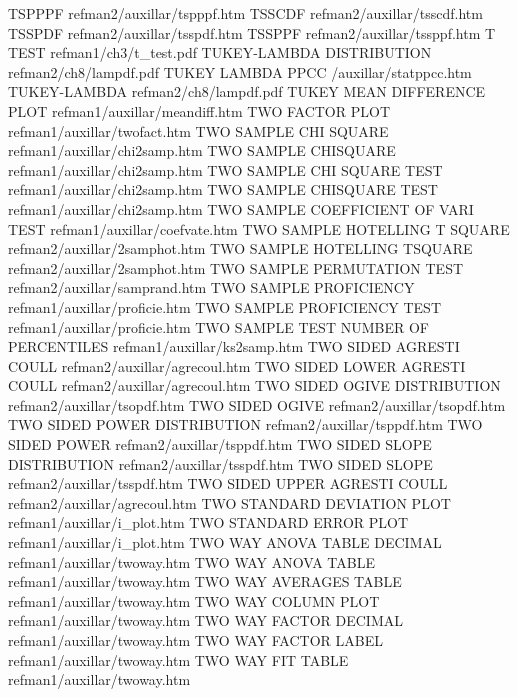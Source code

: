 TSPPPF                                  refman2/auxillar/tspppf.htm
TSSCDF                                  refman2/auxillar/tsscdf.htm
TSSPDF                                  refman2/auxillar/tsspdf.htm
TSSPPF                                  refman2/auxillar/tssppf.htm
T TEST                                  refman1/ch3/t_test.pdf
TUKEY-LAMBDA DISTRIBUTION               refman2/ch8/lampdf.pdf
TUKEY LAMBDA PPCC                       /auxillar/statppcc.htm
TUKEY-LAMBDA                            refman2/ch8/lampdf.pdf
TUKEY MEAN DIFFERENCE PLOT              refman1/auxillar/meandiff.htm
TWO FACTOR PLOT                         refman1/auxillar/twofact.htm
TWO SAMPLE CHI SQUARE                   refman1/auxillar/chi2samp.htm
TWO SAMPLE CHISQUARE                    refman1/auxillar/chi2samp.htm
TWO SAMPLE CHI SQUARE TEST              refman1/auxillar/chi2samp.htm
TWO SAMPLE CHISQUARE TEST               refman1/auxillar/chi2samp.htm
TWO SAMPLE COEFFICIENT OF VARI TEST     refman1/auxillar/coefvate.htm
TWO SAMPLE HOTELLING T SQUARE           refman2/auxillar/2samphot.htm
TWO SAMPLE HOTELLING TSQUARE            refman2/auxillar/2samphot.htm
TWO SAMPLE PERMUTATION TEST             refman2/auxillar/samprand.htm
TWO SAMPLE PROFICIENCY                  refman1/auxillar/proficie.htm
TWO SAMPLE PROFICIENCY TEST             refman1/auxillar/proficie.htm
TWO SAMPLE TEST NUMBER OF PERCENTILES   refman1/auxillar/ks2samp.htm
TWO SIDED AGRESTI COULL                 refman2/auxillar/agrecoul.htm
TWO SIDED LOWER AGRESTI COULL           refman2/auxillar/agrecoul.htm
TWO SIDED OGIVE DISTRIBUTION            refman2/auxillar/tsopdf.htm
TWO SIDED OGIVE                         refman2/auxillar/tsopdf.htm
TWO SIDED POWER DISTRIBUTION            refman2/auxillar/tsppdf.htm
TWO SIDED POWER                         refman2/auxillar/tsppdf.htm
TWO SIDED SLOPE DISTRIBUTION            refman2/auxillar/tsspdf.htm
TWO SIDED SLOPE                         refman2/auxillar/tsspdf.htm
TWO SIDED UPPER AGRESTI COULL           refman2/auxillar/agrecoul.htm
TWO STANDARD DEVIATION PLOT             refman1/auxillar/i_plot.htm
TWO STANDARD ERROR PLOT                 refman1/auxillar/i_plot.htm
TWO WAY ANOVA TABLE DECIMAL             refman1/auxillar/twoway.htm
TWO WAY ANOVA TABLE                     refman1/auxillar/twoway.htm
TWO WAY AVERAGES TABLE                  refman1/auxillar/twoway.htm
TWO WAY COLUMN PLOT                     refman1/auxillar/twoway.htm
TWO WAY FACTOR DECIMAL                  refman1/auxillar/twoway.htm
TWO WAY FACTOR LABEL                    refman1/auxillar/twoway.htm
TWO WAY FIT TABLE                       refman1/auxillar/twoway.htm
